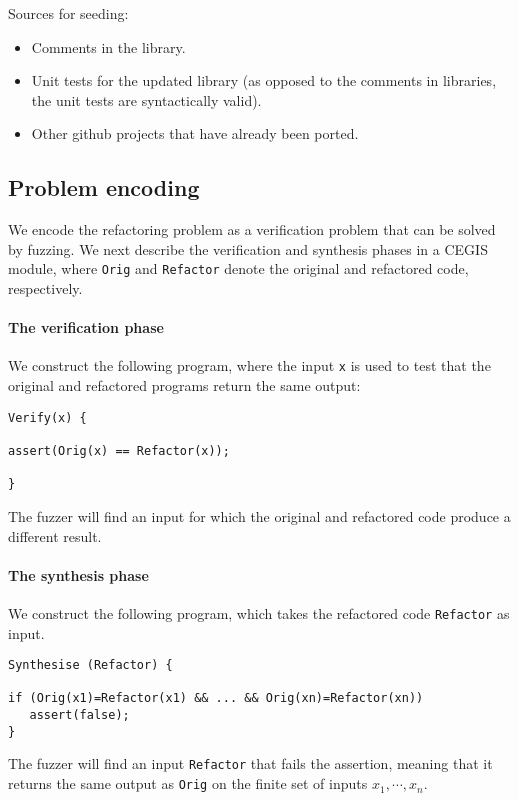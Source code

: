 \documentclass[runningheads,a4paper]{llncs}
\begin{document}
Sources for seeding:
\begin{itemize}
\item Comments in the library.
\item Unit tests for the updated library (as opposed to the comments in libraries,
  the unit tests are syntactically valid).
\item Other github projects that have already been ported.
\end{itemize}  


\subsection{Problem encoding}\label{sec:encoding}
We encode the refactoring problem as a verification problem that can be solved by
fuzzing. We next describe the verification and synthesis phases in a CEGIS module,
where \texttt{Orig} and \texttt{Refactor} denote the original and refactored code,
respectively.

\paragraph{The verification phase} We construct the following program, where the input
\texttt{x} is used to test that the original and refactored programs return
the same output:

\begin{lstlisting}[mathescape=true,showstringspaces=false]
Verify(x) {

assert(Orig(x) == Refactor(x));

}
\end{lstlisting}

The fuzzer will find an input for which the original and refactored code
produce a different result.

\paragraph{The synthesis phase} We construct the following program, which
takes the refactored code \texttt{Refactor} as input.

\begin{lstlisting}[mathescape=true,showstringspaces=false]
Synthesise (Refactor) {

if (Orig(x1)=Refactor(x1) && ... && Orig(xn)=Refactor(xn))
   assert(false);
}
\end{lstlisting}

The fuzzer will find an input \texttt{Refactor} that fails the assertion,
meaning that it returns the same output as \texttt{Orig}
on the finite set of inputs \texttt{$x_1, \cdots, x_n$}.
\end{document}
